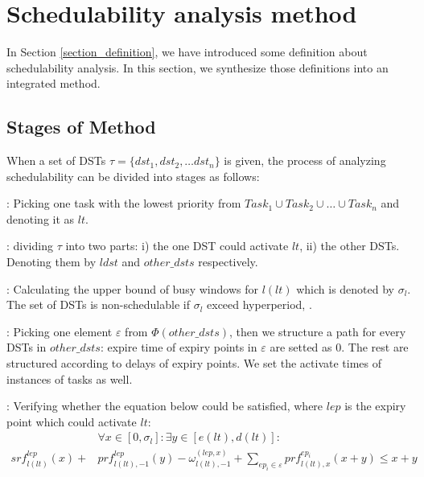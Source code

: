 \documentclass[sigconf]{acmart}
\begin{document}
\section{Schedulability analysis method}
In Section \ref{section_definition}, we have introduced some definition about schedulability analysis. In this section, we synthesize those definitions into an integrated method.

\subsection{Stages of Method}\label{section_8steps}
When a set of DSTs $\tau=\{dst_1,dst_2, \dots dst_n\}$ is given, the process of analyzing schedulability can be divided into stages as follows:
\begin{compactenum}

  \item: Picking one task with the lowest priority from $Task_1\cup Task_2\cup\dots\cup Task_n$ and denoting it as $lt$. %
  \item: dividing $\tau$ into two parts: i) the one DST could activate $lt$, ii) the other DSTs. Denoting them by $ldst$ and $other\_dsts$ respectively. %

  \item: Calculating the upper bound of busy windows for $l(lt)$ which is denoted by $\sigma_l$. The set of DSTs is non-schedulable if $\sigma_l$ exceed hyperperiod, .%
  
  \item: Picking one element $\varepsilon$ from $\Phi(other\_dsts)$, then we structure a path for every DSTs in $other\_dsts$: expire time of expiry points in $\varepsilon$ are setted as 0. The rest are structured according to delays of expiry points. We set the activate times of instances of tasks as well.%

  \item: Verifying whether the equation below could be satisfied, where $lep$ is the expiry point which could activate $lt$:%
  \begin{equation}\begin{split}
      &\forall x\in[0,\sigma_l]:\exists y\in[e(lt),d(lt)]:\\
      srf^{lep}_{l(lt)}(x)+&prf^{lep}_{l(lt),-1}(y)-\omega^{(lep,x)}_{l(lt),-1}+\sum\limits_{ep_i\in\varepsilon}prf^{ep_i}_{l(lt),x}(x+y)\leq x+y
    \end{split}\label{equation_verify}\end{equation}
  

\end{compactenum}
\end{document}
